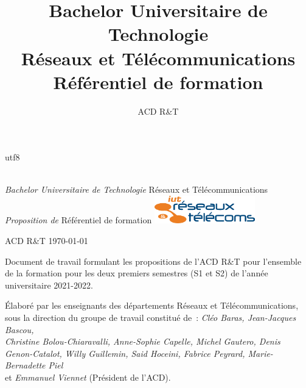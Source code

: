 utf8\documentclass[10pt,french]{article} %
\title{Bachelor Universitaire de Technologie\\
Réseaux et Télécommunications\\
Référentiel de formation}
\author{ACD R\&T}%
\begin{document}

\renewcommand{\labelitemi}{$\bullet$}
\renewcommand{\labelitemii}{$\circ$}
\pagestyle{BO}

\thispagestyle{empty}
\begin{center}
~\\
\vskip 3cm
{\huge
{\em Bachelor Universitaire de Technologie}
\vskip 1cm
Réseaux et Télécommunications
}
\vskip 2cm
{\em Proposition de}
\vskip 2mm
{\huge
Référentiel de formation
}
\vskip 2cm
\includegraphics[height=12mm]{img/logo_IUT_R_T_condense}

\vskip 1cm
{\Large
ACD R\&T
}
\vskip 5mm
\today


\vskip 2cm
\begin{boitepagetitre}
Document de travail formulant les propositions de l'ACD R\&T pour l'ensemble de la formation pour les deux premiers semestres (S1 et S2) de l'année universitaire 2021-2022.
\medskip

Élaboré par les enseignants des départements Réseaux et Télécommunications, sous la direction du groupe de travail constitué de~:
{\em Cléo Baras, Jean-Jacques Bascou,\\
Christine Bolou-Chiaravalli, Anne-Sophie Capelle, Michel Gautero, Denis\\Genon-Catalot, Willy Guillemin, Said Hoceini, Fabrice Peyrard, Marie-Bernadette Piel} \\
et {\em Emmanuel Viennet} (Président de l'ACD).
\end{boitepagetitre}

\end{center}

\clearpage

\tableofcontents %
	

%
%
\end{document}
